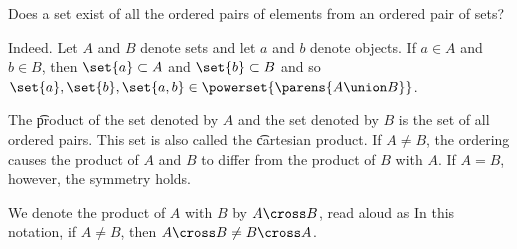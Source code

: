 

Does a set exist of all the ordered pairs of elements from an ordered pair of sets?


Indeed.
Let $A$ and $B$ denote sets and let $a$ and $b$ denote objects.
If $a \in A$ and $b \in B$, then $\set{a} \subset A$ and $\set{b} \subset B$ and so $\set{a},\set{b},\set{a, b} \in \powerset{\parens{A \union B}}$.



The \t{product} of the set denoted by $A$ and the set denoted by $B$ is the set of all ordered pairs.
This set is also called the \t{cartesian product}.
If $A \neq B$, the ordering causes the product of $A$ and $B$ to differ from the product of
$B$ with $A$.
If $A = B$, however, the symmetry holds.


We denote the product of $A$ with $B$ by $A \cross B$, read aloud as 
In this notation, if $A \neq B$, then $A \cross B \neq B \cross A$.

\blankpage
